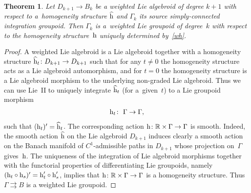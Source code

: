 \documentclass[10pt,a4paper]{amsart}
\newcommand{\rmh}{\textnormal{h}}
\numberwithin{equation}{section}
\newtheorem{Theorem}{Theorem}[section]
\begin{document}
 \begin{Theorem}
Let $D_{k+1} \rightarrow B_{k}$ be a weighted Lie algebroid of degree $k+1$ with respect to a~homogeneity structure $\widehat{\rm h}$ and $\Gamma_{k}$ its source simply-connected integration groupoid.
Then $\Gamma_{k}$ is a~weighted Lie groupoid of degree~$k$ with respect to the homogeneity structure~${\rm h}$ uniquely determined by~\eqref{wh}.
\end{Theorem}



\begin{proof}
A weighted Lie algebroid  is a Lie algebroid together with a homogeneity structure   $\widehat{\rmh}_{t}\colon D_{k+1} \rightarrow D_{k+1}$ such that  for  any $t\neq 0$ the homogeneity structure acts as  a  Lie algebroid automorphism, and for $t=0$  the homogeneity structure is a Lie algebroid morphism to the underlying non-graded Lie algebroid. Thus we can use Lie~II to uniquely integrate $\widehat{\rmh}_{t}$ (for a~given~$t$) to a Lie groupoid morphism
\begin{gather*}
\rmh_{t}\colon \  \Gamma \rightarrow \Gamma,
\end{gather*}
 such that ($\rmh_{t})' = \widehat{\rmh}_{t}$.
 The corresponding action $\rmh\colon {\mathbb R}\times\Gamma\to\Gamma$ is smooth. Indeed, the smooth action $\widehat{\rmh}$ on the Lie algebroid $D_{k+1}$ induces clearly a smooth action on the Banach manifold of $C^1$-admissible paths in $D_{k+1}$ whose projection on~$\Gamma$ gives~$\rmh$.
The uniqueness of the integration of Lie algebroid morphisms   together with the functorial properties of dif\/ferentiating Lie groupoids,  namely $(\rmh_{t} \circ \rmh_{s})'= \rmh'_{t} \circ \rmh'_{s}$, implies that  $\rmh\colon \mathbb{R} \times  \Gamma \rightarrow \Gamma$ is a homogeneity structure. Thus $\Gamma \rightrightarrows B$ is a weighted Lie groupoid.


\end{proof}
\end{document}
